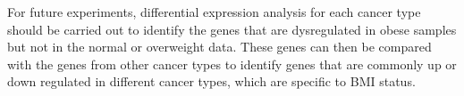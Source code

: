 \documentclass[12pt, a4paper]{article}
\begin{document}
For future experiments, differential expression analysis for each cancer type should be carried out to identify the genes that are dysregulated in obese samples but not in the normal or overweight data.
These genes can then be compared with the genes from other cancer types to identify genes that are  commonly up or down regulated in different cancer types, which are specific to BMI status.


\vspace{-11pt}



\end{document}
